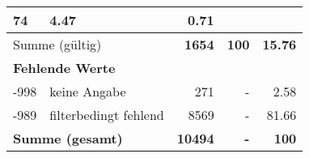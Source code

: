 \begin{longtable}{lXrrr}
       \num{74} &
       \num[round-mode=places,round-precision=2]{4,47} &
         \num[round-mode=places,round-precision=2]{0,71} \\
     \midrule
     \multicolumn{2}{l}{Summe (gültig)} &
       \textbf{\num{1654}} &
     \textbf{100} &
       \textbf{\num[round-mode=places,round-precision=2]{15,76}} \\
     \multicolumn{5}{l}{\textbf{Fehlende Werte}}\\
       -998 &
       keine Angabe &
         \num{271} &
        - &
         \num[round-mode=places,round-precision=2]{2,58} \\
       -989 &
       filterbedingt fehlend &
         \num{8569} &
        - &
         \num[round-mode=places,round-precision=2]{81,66} \\
     \midrule
     \multicolumn{2}{l}{\textbf{Summe (gesamt)}} &
          \textbf{\num{10494}} &
        \textbf{-} &
        \textbf{100} \\
     \bottomrule
     \end{longtable}
     
